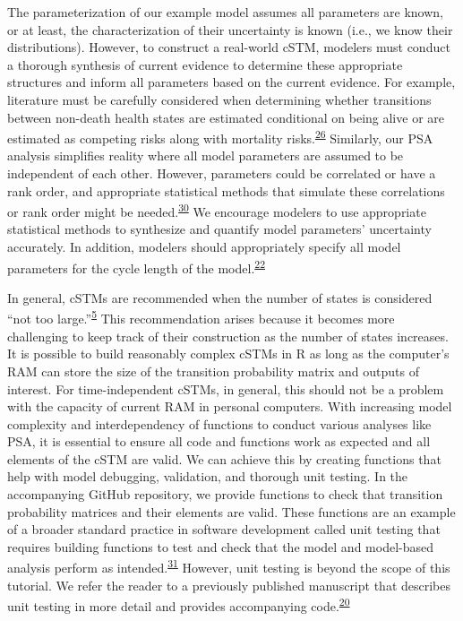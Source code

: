 \documentclass[
]{article}
\begin{document}
The parameterization of our example model assumes all parameters are known, or at least, the characterization of their uncertainty is known (i.e., we know their distributions). However, to construct a real-world cSTM, modelers must conduct a thorough synthesis of current evidence to determine these appropriate structures and inform all parameters based on the current evidence. For example, literature must be carefully considered when determining whether transitions between non-death health states are estimated conditional on being alive or are estimated as competing risks along with mortality risks.\textsuperscript{\protect\hyperlink{ref-Briggs2012}{26}} Similarly, our PSA analysis simplifies reality where all model parameters are assumed to be independent of each other. However, parameters could be correlated or have a rank order, and appropriate statistical methods that simulate these correlations or rank order might be needed.\textsuperscript{\protect\hyperlink{ref-Goldhaber-Fiebert2015}{30}} We encourage modelers to use appropriate statistical methods to synthesize and quantify model parameters' uncertainty accurately. In addition, modelers should appropriately specify all model parameters for the cycle length of the model.\textsuperscript{\protect\hyperlink{ref-Hunink2014}{22}}

In general, cSTMs are recommended when the number of states is considered ``not too large.''\textsuperscript{\protect\hyperlink{ref-Siebert2012c}{5}} This recommendation arises because it becomes more challenging to keep track of their construction as the number of states increases. It is possible to build reasonably complex cSTMs in R as long as the computer's RAM can store the size of the transition probability matrix and outputs of interest. For time-independent cSTMs, in general, this should not be a problem with the capacity of current RAM in personal computers. With increasing model complexity and interdependency of functions to conduct various analyses like PSA, it is essential to ensure all code and functions work as expected and all elements of the cSTM are valid. We can achieve this by creating functions that help with model debugging, validation, and thorough unit testing. In the accompanying GitHub repository, we provide functions to check that transition probability matrices and their elements are valid. These functions are an example of a broader standard practice in software development called unit testing that requires building functions to test and check that the model and model-based analysis perform as intended.\textsuperscript{\protect\hyperlink{ref-Wickham2021}{31}} However, unit testing is beyond the scope of this tutorial. We refer the reader to a previously published manuscript that describes unit testing in more detail and provides accompanying code.\textsuperscript{\protect\hyperlink{ref-Alarid-Escudero2019e}{20}}
\end{document}
